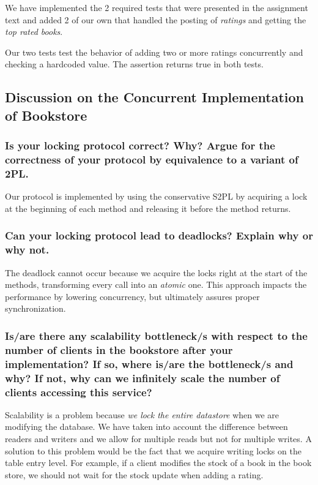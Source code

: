 \documentclass{article}      %
\begin{document}
We have implemented the 2 required tests that were presented in the assignment text and added 2 of our own that handled the posting of \emph{ratings} and getting the \emph{top rated books}.

Our two tests test the behavior of adding two or more ratings concurrently and checking a hardcoded value. The assertion returns true in both tests.

\subsection*{Discussion on the Concurrent Implementation of Bookstore}

\subsubsection*{Is your locking protocol correct? Why? Argue for the correctness of your protocol by equivalence to a variant of 2PL.}

Our protocol is implemented by using the conservative S2PL by acquiring a lock at the beginning of each method and releasing it before the method returns.\\

\subsubsection*{Can your locking protocol lead to deadlocks? Explain why or why not.}

The deadlock cannot occur because we acquire the locks right at the start of the methods, transforming every call into an \emph{atomic} one. This approach impacts the performance by lowering concurrency, but ultimately assures proper synchronization.\\

\subsubsection*{Is/are there any scalability bottleneck/s with respect to the number of clients in the bookstore after your implementation? If so, where is/are the bottleneck/s and why? If not, why can we infinitely scale the number of clients accessing this service?}

Scalability is a problem because \emph{we lock the entire datastore} when we are modifying the database. We have taken into account the difference between readers and writers and we allow for multiple reads but not for multiple writes. A solution to this problem would be the fact that we acquire writing locks on the table entry level. For example, if a client modifies the stock of a book in the book store, we should not wait for the stock update when adding a rating.\\
\end{document}
